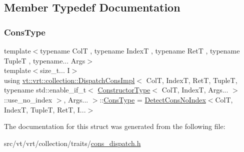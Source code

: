 \subsection{Member Typedef Documentation}
\mbox{\label{structvt_1_1vrt_1_1collection_1_1_dispatch_cons_impl_3_01_col_t_00_01_index_t_00_01_ret_t_00_01_7bb06b6d2cbf7ddb7e46d39f1adc61e1_a61a00682e44b5dd476dd37289a1a45c1}} 
\subsubsection{\texorpdfstring{Cons\+Type}{ConsType}}
{\footnotesize\ttfamily template$<$typename ColT , typename IndexT , typename RetT , typename TupleT , typename... Args$>$ \\
template$<$size\+\_\+t... I$>$ \\
using \hyperlink{structvt_1_1vrt_1_1collection_1_1_dispatch_cons_impl}{vt\+::vrt\+::collection\+::\+Dispatch\+Cons\+Impl}$<$ ColT, IndexT, RetT, TupleT, typename std\+::enable\+\_\+if\+\_\+t$<$ \hyperlink{structvt_1_1vrt_1_1collection_1_1_constructor_type}{Constructor\+Type}$<$ ColT, IndexT, Args... $>$\+::use\+\_\+no\+\_\+index $>$, Args... $>$\+::\hyperlink{structvt_1_1vrt_1_1collection_1_1_dispatch_cons_impl_3_01_col_t_00_01_index_t_00_01_ret_t_00_01_7bb06b6d2cbf7ddb7e46d39f1adc61e1_a61a00682e44b5dd476dd37289a1a45c1}{Cons\+Type} =  \hyperlink{structvt_1_1vrt_1_1collection_1_1_detect_cons_no_index}{Detect\+Cons\+No\+Index}$<$ColT, IndexT, TupleT, RetT, I...$>$}



The documentation for this struct was generated from the following file\+:\begin{DoxyCompactItemize}
\item 
src/vt/vrt/collection/traits/\hyperlink{cons__dispatch_8h}{cons\+\_\+dispatch.\+h}\end{DoxyCompactItemize}
